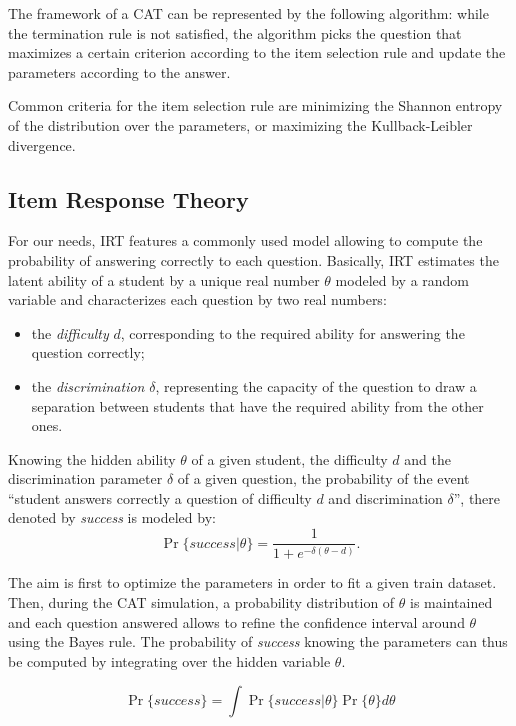 \documentclass{sig-alternate}
\newcommand\alert[1]{\textcolor{red}{#1}}
\begin{document}
The framework of a CAT can be represented by the following algorithm: while the termination rule is not satisfied, the algorithm picks the question that maximizes a certain criterion according to the item selection rule and update the parameters according to the answer.

Common criteria for the item selection rule are minimizing the Shannon entropy of the distribution over the parameters, or maximizing the Kullback-Leibler divergence. %

\subsection{Item Response Theory}

For our needs, IRT features a commonly used model allowing to compute the probability of answering correctly to each question. Basically, IRT estimates the latent ability of a student by a unique real number $\theta$ modeled by a random variable and characterizes each question by two real numbers:

\begin{itemize}
\item the \emph{difficulty} $d$, corresponding to the required ability for answering the question correctly;
\item the \emph{discrimination} $\delta$, representing the capacity of the question to draw a separation between students that have the required ability from the other ones.
\end{itemize}

Knowing the hidden ability $\theta$ of a given student, the difficulty $d$ and the discrimination parameter $\delta$ of a given question, the probability of the event “student answers correctly a question of difficulty $d$ and discrimination $\delta$”, there denoted by \emph{success} is modeled by:
\[ \Pr\{success|\theta\} = \frac1{1+e^{-\delta(\theta - d)}}. \]

The aim is first to optimize the parameters in order to fit a given train dataset. Then, during the CAT simulation, a probability distribution of $\theta$ is maintained and each question answered allows to refine the confidence interval around $\theta$ using the Bayes rule. The probability of \emph{success} knowing the parameters can thus be computed by integrating over the hidden variable $\theta$.

\[ \Pr\{success\} = \int \Pr\{success|\theta\} \Pr\{\theta\} d\theta \]
\end{document}
